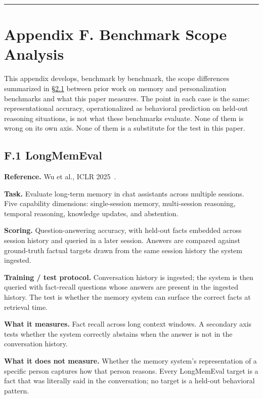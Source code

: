 \begin{center}\rule{0.5\linewidth}{0.5pt}\end{center}

\hypertarget{appendix-f.-benchmark-scope-analysis}{%
\section{Appendix F. Benchmark Scope
Analysis}\label{appendix-f.-benchmark-scope-analysis}}

This appendix develops, benchmark by benchmark, the scope differences
summarized in \hyperref[prior-measurement-targets-and-the-gap-representational-accuracy-fills]{§2.1} between prior work on memory and personalization
benchmarks and what this paper measures. The point in each case is the
same: representational accuracy, operationalized as behavioral
prediction on held-out reasoning situations, is not what these
benchmarks evaluate. None of them is wrong on its own axis. None of them
is a substitute for the test in this paper.

\hypertarget{f.1-longmemeval}{%
\subsection{F.1 LongMemEval}\label{f.1-longmemeval}}

\textbf{Reference.} Wu et al., ICLR 2025~\citep{wu2025longmemeval}.

\textbf{Task.} Evaluate long-term memory in chat assistants across
multiple sessions. Five capability dimensions: single-session memory,
multi-session reasoning, temporal reasoning, knowledge updates, and
abstention.

\textbf{Scoring.} Question-answering accuracy, with held-out facts
embedded across session history and queried in a later session. Answers
are compared against ground-truth factual targets drawn from the same
session history the system ingested.

\textbf{Training / test protocol.} Conversation history is ingested; the
system is then queried with fact-recall questions whose answers are
present in the ingested history. The test is whether the memory system
can surface the correct facts at retrieval time.

\textbf{What it measures.} Fact recall across long context windows. A
secondary axis tests whether the system correctly abstains when the
answer is not in the conversation history.

\textbf{What it does not measure.} Whether the memory system's
representation of a specific person captures how that person reasons.
Every LongMemEval target is a fact that was literally said in the
conversation; no target is a held-out behavioral pattern.

